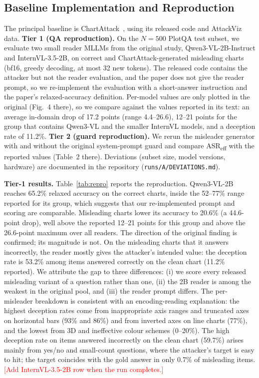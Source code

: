 \documentclass[conference]{IEEEtran}
\newcommand{\todo}[1]{\textcolor{red}{[#1]}}
\begin{document}
\subsection{Baseline Implementation and Reproduction}
The principal baseline is ChartAttack~\cite{ortizbarajas2026chartattack}, using its released code and AttackViz data.
\textbf{Tier 1 (QA reproduction).} On the $N=500$ PlotQA test subset, we evaluate two small reader MLLMs from the original study, Qwen3-VL-2B-Instruct and InternVL-3.5-2B, on correct and ChartAttack-generated misleading charts (bf16, greedy decoding, at most 32 new tokens). The released code contains the attacker but not the reader evaluation, and the paper does not give the reader prompt, so we re-implement the evaluation with a short-answer instruction and the paper's relaxed-accuracy definition. Per-model values are only plotted in the original (Fig.~4 there), so we compare against the values reported in its text: an average in-domain drop of 17.2 points (range 4.4--26.6), 12--21 points for the group that contains Qwen3-VL and the smaller InternVL models, and a deception rate of 11.2\%.
\textbf{Tier 2 (guard reproduction).} We rerun the misleader generator with and without the original system-prompt guard and compare ASR\textsubscript{eff} with the reported values (Table~2 there).
Deviations (subset size, model versions, hardware) are documented in the repository (\texttt{runs/A/DEVIATIONS.md}).

\textbf{Tier-1 results.} Table~\ref{tab:repro} reports the reproduction. Qwen3-VL-2B reaches 65.2\% relaxed accuracy on the correct charts, inside the 52--77\% range reported for its group, which suggests that our re-implemented prompt and scoring are comparable. Misleading charts lower its accuracy to 20.6\% (a 44.6-point drop), well above the reported 12--21 points for this group and above the 26.6-point maximum over all readers. The direction of the original finding is confirmed; its magnitude is not. On the misleading charts that it answers incorrectly, the reader mostly gives the attacker's intended value: the deception rate is 53.2\% among items answered correctly on the clean chart (11.2\% reported). We attribute the gap to three differences: (i) we score every released misleading variant of a question rather than one, (ii) the 2B reader is among the weakest in the original pool, and (iii) the reader prompt differs. The per-misleader breakdown is consistent with an encoding-reading explanation: the highest deception rates come from inappropriate axis ranges and truncated axes on horizontal bars (93\% and 86\%) and from inverted axes on line charts (77\%), and the lowest from 3D and ineffective colour schemes (0--20\%). The high deception rate on items answered incorrectly on the clean chart (59.7\%) arises mainly from yes/no and small-count questions, where the attacker's target is easy to hit; the target coincides with the gold answer in only 0.7\% of misleading items. \todo{Add InternVL-3.5-2B row when the run completes.}
\end{document}
